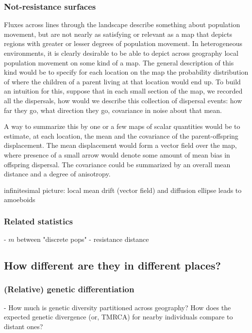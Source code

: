 \documentclass{ar-1col}
\begin{document}
\subsubsection{Not-resistance surfaces}

Fluxes across lines through the landscape describe something about population movement, but are not nearly as satisfying or relevant as a map that depicts regions with greater or lesser degrees of population movement.
In heterogeneous environments, it is clearly desirable to be able to depict across geography local population movement on some kind of a map.
The general description of this kind would be to specify for each location on the map 
the probability distribution of where the children of a parent living at that location would end up.
To build an intuition for this, 
suppose that in each small section of the map, 
we recorded all the dispersals, 
how would we describe this collection of dispersal events:
how far they go,
what direction they go, 
covariance in noise about that mean.


A way to summarize this by one or a few maps of scalar quantities would be to estimate, at each location, the mean and the covariance of the parent-offspring displacement.
The mean displacement would form a vector field over the map, 
where presence of a small arrow would denote some amount of mean bias in offspring dispersal.
The covariance could be summarized by an overall mean distance and a degree of anisotropy.

infinitesimal picture: local mean drift (vector field) and diffusion ellipse leads to amoeboids


\subsubsection{Related statistics}

        - $m$ between "discrete pops"
        - resistance distance


\subsection{How different are they in different places?}

\subsubsection{(Relative) genetic differentiation}

        - How much is genetic diversity partitioned across geography?
            How does the expected genetic divergence (or, TMRCA) for nearby individuals compare to distant ones?
          
\end{document}
